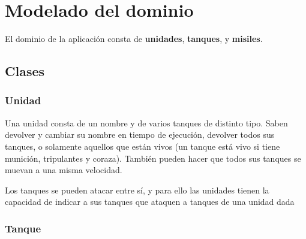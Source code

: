 

%






\clearpage
\tableofcontents
\clearpage 

\lstset{style=smalltalk}

\section{Modelado del dominio}

El dominio de la aplicación consta de \textbf{unidades}, \textbf{tanques}, y \textbf{misiles}. 

\subsection{Clases}

\subsubsection{Unidad}

Una unidad consta de un nombre y de varios tanques de distinto tipo. Saben devolver y cambiar su nombre en tiempo de ejecución, devolver todos sus tanques, o solamente aquellos que están vivos (un tanque está vivo si tiene munición, tripulantes y coraza). También pueden hacer que todos sus tanques se muevan a una misma velocidad.

Los tanques se pueden atacar entre sí, y para ello las unidades tienen la capacidad de indicar a sus tanques que ataquen a tanques de una unidad dada

\subsubsection{Tanque}

